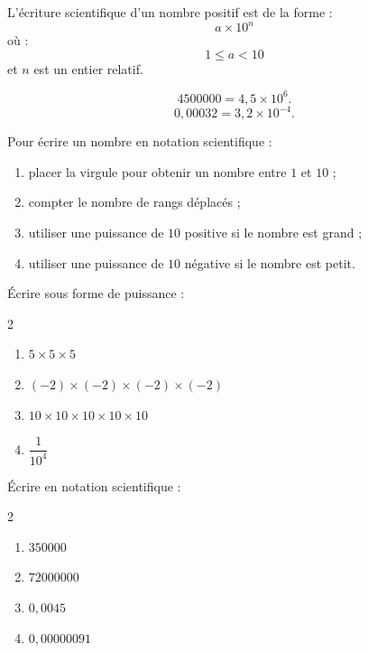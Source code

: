 \documentclass[11pt,a4paper]{article}
\newcounter{exercice}
\begin{document}
\begin{definitionbox}
L'écriture scientifique d'un nombre positif est de la forme :
\[
a\times10^n
\]
où :
\[
1\leq a<10
\]
et $n$ est un entier relatif.
\end{definitionbox}

\begin{exemple}
\[
4500000=4{,}5\times10^6.
\]
\[
0{,}00032=3{,}2\times10^{-4}.
\]
\end{exemple}

\begin{methode}
Pour écrire un nombre en notation scientifique :
\begin{enumerate}
  \item placer la virgule pour obtenir un nombre entre $1$ et $10$ ;
  \item compter le nombre de rangs déplacés ;
  \item utiliser une puissance de $10$ positive si le nombre est grand ;
  \item utiliser une puissance de $10$ négative si le nombre est petit.
\end{enumerate}
\end{methode}

\begin{exercice}
Écrire sous forme de puissance :
\begin{multicols}{2}
\begin{enumerate}[label=\alph*)]
  \item $5\times5\times5$
  \item $(-2)\times(-2)\times(-2)\times(-2)$
  \item $10\times10\times10\times10\times10$
  \item $\dfrac{1}{10^4}$
\end{enumerate}
\end{multicols}
\end{exercice}

\begin{exercice}[Méthode]
Écrire en notation scientifique :
\begin{multicols}{2}
\begin{enumerate}[label=\alph*)]
  \item $350000$
  \item $72000000$
  \item $0{,}0045$
  \item $0{,}00000091$
\end{enumerate}
\end{multicols}
\end{exercice}
\end{document}
